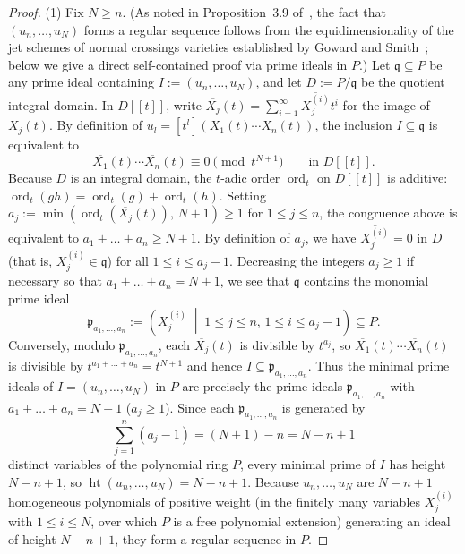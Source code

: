 \documentclass[a4paper, 12pt]{amsart}
\theoremstyle{remark}
\begin{document}
\begin{proof}
(1) Fix $N \ge n$.
(As noted in Proposition~3.9 of~\cite{bruschek_arc_2013},
the fact that $(u_n, \dots, u_N)$ forms a regular sequence follows from the equidimensionality
of the jet schemes of normal crossings varieties established by Goward and Smith~\cite{goward_smith_2006};
below we give a direct self-contained proof via prime ideals in $P$.)
Let $\mathfrak{q} \subseteq P$ be any prime ideal containing $I := (u_n, \dots, u_N)$,
and let $D := P / \mathfrak{q}$ be the quotient integral domain.
In $D[[t]]$,
write $\overline{X_j}(t) = \sum_{i = 1}^\infty \overline{X_j^{(i)}} t^i$ for the image of $X_j(t)$.
By definition of $u_l = [t^l](X_1(t) \cdots X_n(t))$,
the inclusion $I \subseteq \mathfrak{q}$ is equivalent to
\begin{equation*}
  \overline{X_1}(t) \cdots \overline{X_n}(t) \equiv 0 \pmod{t^{N + 1}} \qquad \text{in } D[[t]].
\end{equation*}
Because $D$ is an integral domain,
the $t$-adic order $\operatorname{ord}_t$ on $D[[t]]$ is additive:
$\operatorname{ord}_t(g h) = \operatorname{ord}_t(g) + \operatorname{ord}_t(h)$.
Setting $a_j := \min\left(\operatorname{ord}_t(\overline{X_j}(t)), \, N + 1\right) \ge 1$ for $1 \le j \le n$,
the congruence above is equivalent to $a_1 + \dots + a_n \ge N + 1$.
By definition of $a_j$,
we have $\overline{X_j^{(i)}} = 0$ in $D$ (that is, $X_j^{(i)} \in \mathfrak{q}$) for all $1 \le i \le a_j - 1$.
Decreasing the integers $a_j \ge 1$ if necessary so that $a_1 + \dots + a_n = N + 1$,
we see that $\mathfrak{q}$ contains the monomial prime ideal
\begin{equation*}
  \mathfrak{p}_{a_1, \dots, a_n} := \left(X_j^{(i)} \;\middle|\; 1 \le j \le n, \, 1 \le i \le a_j - 1\right) \subseteq P.
\end{equation*}
Conversely,
modulo $\mathfrak{p}_{a_1, \dots, a_n}$,
each $\overline{X_j}(t)$ is divisible by $t^{a_j}$,
so $\overline{X_1}(t) \cdots \overline{X_n}(t)$ is divisible by $t^{a_1 + \dots + a_n} = t^{N + 1}$ and hence $I \subseteq \mathfrak{p}_{a_1, \dots, a_n}$.
Thus the minimal prime ideals of $I = (u_n, \dots, u_N)$ in $P$ are precisely the prime ideals $\mathfrak{p}_{a_1, \dots, a_n}$ with $a_1 + \dots + a_n = N + 1$ ($a_j \ge 1$).
Since each $\mathfrak{p}_{a_1, \dots, a_n}$ is generated by
\begin{equation*}
  \sum_{j = 1}^n (a_j - 1) = (N + 1) - n = N - n + 1
\end{equation*}
distinct variables of the polynomial ring $P$,
every minimal prime of $I$ has height $N - n + 1$,
so $\operatorname{ht}(u_n, \dots, u_N) = N - n + 1$.
Because $u_n, \dots, u_N$ are $N - n + 1$ homogeneous polynomials of positive weight (in the finitely many variables $X_j^{(i)}$ with $1 \le i \le N$, over which $P$ is a free polynomial extension) generating an ideal of height $N - n + 1$,
they form a regular sequence in $P$.


\end{proof}
\end{document}
